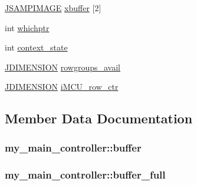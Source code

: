 \begin{DoxyCompactItemize}
\hyperlink{jpeglib_8h_a4bf858e4d42202287e786bdec2f3b62b}{J\+S\+A\+M\+P\+I\+M\+A\+G\+E} \hyperlink{structmy__main__controller_a29fc35521c04489fdb6b7a7e758fb82a}{xbuffer} \mbox{[}2\mbox{]}
\item 
int \hyperlink{structmy__main__controller_a9838025ca47813221e8c208ad26bb9e8}{whichptr}
\item 
int \hyperlink{structmy__main__controller_abc90e17934b16420478e95a8875918ae}{context\+\_\+state}
\item 
\hyperlink{jmorecfg_8h_a04ed4674f6f1d0d50ec241531e38274f}{J\+D\+I\+M\+E\+N\+S\+I\+O\+N} \hyperlink{structmy__main__controller_a8fdc8a382fc0be7922e5913b16cbf7dc}{rowgroups\+\_\+avail}
\item 
\hyperlink{jmorecfg_8h_a04ed4674f6f1d0d50ec241531e38274f}{J\+D\+I\+M\+E\+N\+S\+I\+O\+N} \hyperlink{structmy__main__controller_a01c8f176e423a5d8e37637fa8210b236}{i\+M\+C\+U\+\_\+row\+\_\+ctr}
\end{DoxyCompactItemize}


\subsection{Member Data Documentation}
\hypertarget{structmy__main__controller_a448676ac307b69b99e5457744515f058}{}
\subsubsection[{buffer}]{ my\+\_\+main\+\_\+controller\+::buffer}\label{structmy__main__controller_a448676ac307b69b99e5457744515f058}
\hypertarget{structmy__main__controller_a6cd3c916b4d87c97f6fda7daa0816256}{}
\subsubsection[{buffer\+\_\+full}]{ my\+\_\+main\+\_\+controller\+::buffer\+\_\+full}\label{structmy__main__controller_a6cd3c916b4d87c97f6fda7daa0816256}
\hypertarget{structmy__main__controller_abc90e17934b16420478e95a8875918ae}{}
